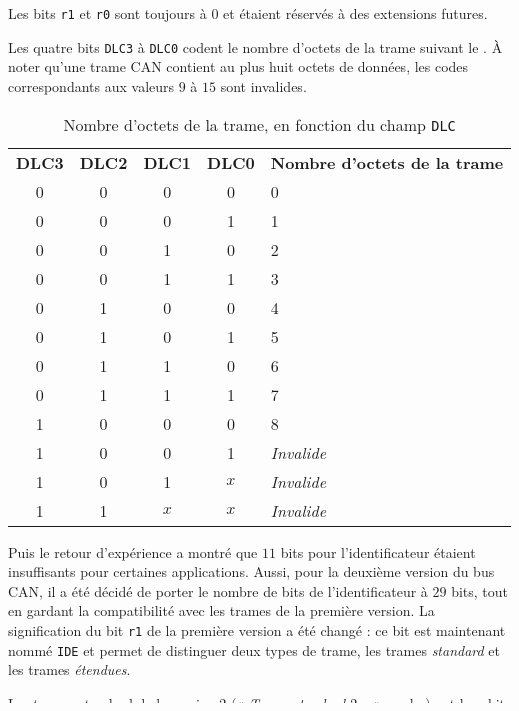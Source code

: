Les bits \texttt{r1} et \texttt{r0} sont toujours à $0$ et étaient réservés à des extensions futures.

Les quatre bits \texttt{DLC3} à \texttt{DLC0} codent le nombre d'octets de la trame suivant le . À noter qu'une trame CAN contient au plus huit octets de données, les codes correspondants aux valeurs $9$ à $15$ sont invalides.

\begin{table}[!t]
  \small
  \centering
  \begin{tabular}{ccccl}
    \textbf{DLC3}& \textbf{DLC2} & \textbf{DLC1} & \textbf{DLC0}  & \textbf{Nombre d'octets de la trame} \\
     0 & 0 & 0 & 0 & 0 \\
     0 & 0 & 0 & 1 & 1 \\
     0 & 0 & 1 & 0 & 2 \\
     0 & 0 & 1 & 1 & 3 \\
     0 & 1 & 0 & 0 & 4 \\
     0 & 1 & 0 & 1 & 5 \\
     0 & 1 & 1 & 0 & 6 \\
     0 & 1 & 1 & 1 & 7 \\
     1 & 0 & 0 & 0 & 8 \\
     1 & 0 & 0 & 1 & \emph{Invalide} \\
     1 & 0 & 1 & $x$ & \emph{Invalide} \\
     1 & 1 & $x$ & $x$ & \emph{Invalide} \\
   \end{tabular}
  \caption{Nombre d'octets de la trame, en fonction du champ \texttt{DLC}}
  \ligne
\end{table}

Puis le retour d'expérience a montré que $11$ bits pour l'identificateur étaient insuffisants pour certaines applications. Aussi, pour la deuxième version du bus CAN, il a été décidé de porter le nombre de bits de l'identificateur à $29$ bits, tout en gardant la compatibilité avec les trames de la première version. La signification du bit \texttt{r1} de la première version a été changé : ce bit est maintenant nommé \texttt{IDE} et permet de distinguer deux types de trame, les trames \emph{standard} et les trames \emph{étendues}.

Les trames standard de la version 2 (« \emph{Trame standard $2.x$} » sur la ) ont leur bit \texttt{IDE} à $0$, de façon qu'une trame standard $2.x$ soit identique à une trame $1.x$.


